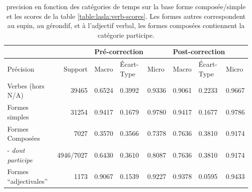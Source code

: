 \begin{table}[h]
\centering
\begin{tabular}{@{}l|r|lll|lll@{}}
\toprule
                                &         & \multicolumn{3}{l}{Pré-correction} & \multicolumn{3}{l}{Post-correction} \\ \midrule
Précision                       & Support & Macro    & Écart-Type   & Micro    & Macro     & Écart-Type   & Micro    \\ \midrule
Verbes (hors N/A)               & 39465   & 0.6524   & 0.3992       & 0.9336   & 0.9061    & 0.2233       & 0.9667   \\
Formes simples                  & 31254   & 0.9417   & 0.1679       & 0.9780   & 0.9417    & 0.1677       & 0.9786   \\
Formes Composées                & 7027    & 0.3570   & 0.3566       & 0.7378   & 0.7636    & 0.3810       & 0.9174   \\
- \textit{dont participe}       & 4946/7027    & 0.6430   & 0.3610       & 0.8087   & 0.7636    & 0.3810       & 0.9174   \\
Formes “adjectivales”           & 1173    & 0.9067   & 0.1539       & 0.9227   & 0.9378    & 0.0595       & 0.9433   \\ \bottomrule
\end{tabular}
\caption{\Gls{precision} en fonction des catégories de temps sur la base forme composée/simple et les scores de la table \ref{table:lasla:verb-scores}. Les formes autres correspondent au supin, au gérondif, et à l'adjectif verbal, les formes composées contiennent la catégorie participe.}
\label{table:lasla:formes-simples-formes-composees}
\end{table}


